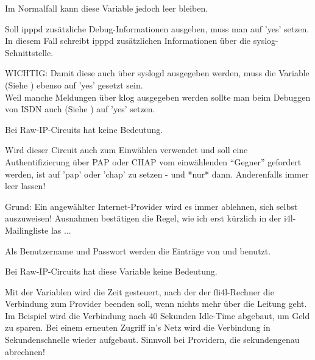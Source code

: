 \begin{description}
  Im Normalfall kann diese Variable jedoch leer bleiben.

  
  Soll ipppd zusätzliche Debug-Informationen ausgeben, muss man
   auf 'yes' setzen. In diesem Fall schreibt ipppd
  zusätzlichen Informationen über die syslog-Schnittstelle.
  
  WICHTIG: Damit diese auch über syslogd ausgegeben werden, muss die
  Variable  
  (Siehe )
  ebenso auf 'yes' gesetzt sein.\\
  Weil manche Meldungen über klog ausgegeben werden sollte man beim Debuggen
  von ISDN auch  (Siehe )
  auf 'yes' setzen.
  
  Bei Raw-IP-Circuits hat  keine Bedeutung.

  
  Wird dieser Circuit auch zum Einwählen verwendet und soll eine
  Authentifizierung über PAP oder CHAP vom einwählenden ``Gegner''
  gefordert werden, ist  auf 'pap' oder 'chap' zu
  setzen - und *nur* dann. Anderenfalls immer leer lassen!
  
  Grund: Ein angewählter Internet-Provider wird es immer ablehnen,
  sich selbst auszuweisen! Ausnahmen bestätigen die Regel, wie ich
  erst kürzlich in der i4l-Mailingliste las ...
  
  Als Benutzername und Passwort werden die Einträge von
   und 
  benutzt.

  Bei Raw-IP-Circuits hat diese Variable keine Bedeutung.

  
  Mit der Variablen  wird die Zeit
  gesteuert, nach der der fli4l-Rechner die Verbindung zum Provider
  beenden soll, wenn nichts mehr über die Leitung geht. Im Beispiel
  wird die Verbindung nach 40 Sekunden Idle-Time abgebaut, um Geld zu
  sparen. Bei einem erneuten Zugriff in's Netz wird die Verbindung in
  Sekundenschnelle wieder aufgebaut. Sinnvoll bei Providern, die
  sekundengenau abrechnen!
  

\end{description}
